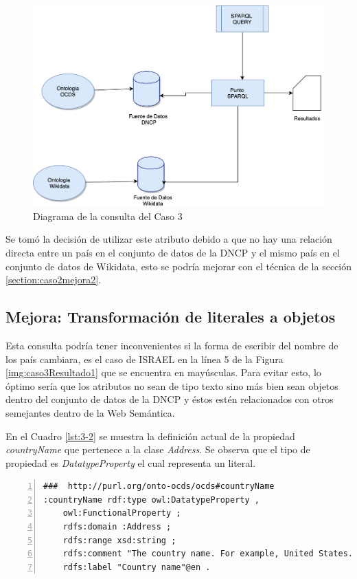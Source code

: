  \begin{figure}[ht!]
    \centering
    \includegraphics[width=150mm]{figuras/Diagramas-Caso3.png}
    \caption{Diagrama de la consulta del Caso 3}
    \label{img:DiagramaCaso3}
 \end{figure}

Se tomó la decisión de utilizar este atributo debido a que no hay una relación directa entre un país en el conjunto de datos de la DNCP y el mismo país en el conjunto de datos de Wikidata, esto se podría mejorar con el técnica de la sección \ref{section:caso2mejora2}.

\subsection{Mejora: Transformación de literales a objetos}
Esta consulta podría tener inconvenientes si la forma de escribir del nombre de los país cambiara, es el caso de ISRAEL en la línea 5 de la Figura \ref{img:caso3Resultado1} que se encuentra en mayúsculas. Para evitar esto, lo óptimo sería que los atributos no sean de tipo texto sino más bien sean objetos dentro del conjunto de datos de la DNCP y éstos estén relacionados con otros semejantes dentro de la Web Semántica.

En el Cuadro \ref{lst:3-2} se muestra la definición actual de la propiedad \textit{countryName} que pertenece a la clase \textit{Address}. Se observa que el tipo de propiedad es \textit{DatatypeProperty} el cual representa un literal.\hfill \break 

\noindent\begin{minipage}[c]{\textwidth}
\begin{lstlisting}[captionpos=b, caption=Definición de la propiedad countryName, label={lst:3-2},  numbers=left,  numberstyle=\tiny\color{mygray},frame=single]
###  http://purl.org/onto-ocds/ocds#countryName
:countryName rdf:type owl:DatatypeProperty ,
    owl:FunctionalProperty ;
    rdfs:domain :Address ;
    rdfs:range xsd:string ;
    rdfs:comment "The country name. For example, United States."@en ;
    rdfs:label "Country name"@en .
 \end{lstlisting}
\end{minipage}


